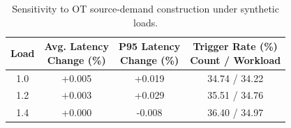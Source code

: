 \begin{table}[t]
\centering
\caption{Sensitivity to OT source-demand construction under synthetic loads.}
\label{tab:ot_demand_sensitivity}
\setlength{\tabcolsep}{4pt}
\renewcommand{\arraystretch}{1.05}

\begin{tabular}{cccc}
\toprule
\textbf{Load}
& \makecell{\textbf{Avg. Latency}\\\textbf{Change (\%)}}
& \makecell{\textbf{P95 Latency}\\\textbf{Change (\%)}}
& \makecell{\textbf{Trigger Rate (\%)}\\\textbf{Count / Workload}} \\
\midrule
1.0 & +0.005 & +0.019 & 34.74 / 34.22 \\
1.2 & +0.003 & +0.029 & 35.51 / 34.76 \\
1.4 & +0.000 & -0.008 & 36.40 / 34.97 \\
\bottomrule
\end{tabular}
\end{table}
